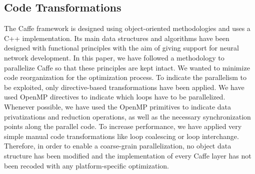 \subsection{Code Transformations}
The Caffe framework is designed using object-oriented methodologies and uses a C++ implementation. 
Its main data structures and algorithms have been designed with 
functional principles with the aim of giving support for neural network 
development. In this paper, we have followed a methodology to 
parallelize Caffe so that these principles are kept intact. We wanted to minimize 
code reorganization for the optimization process.
To indicate the parallelism to be exploited, only directive-based 
transformations have been applied. We have used OpenMP \cite{Open-MP} directives 
to indicate which loops have to be parallelized. Whenever possible, 
we have used the OpenMP primitives to indicate data privatizations 
and reduction operations, as well as the necessary synchronization 
points along the parallel code. To increase performance, we have 
applied very simple manual code transformations like loop coalescing or 
loop interchange. Therefore, in order to enable a coarse-grain 
parallelization, no object data structure has been modified and 
the implementation of every Caffe layer has not been recoded with 
any platform-specific optimization.

